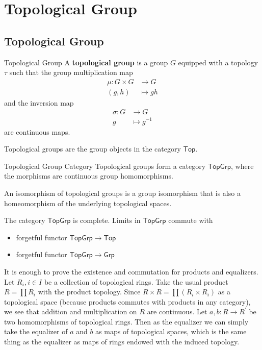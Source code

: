 
\chapter{Topological Group}
\section{Topological Group}
\begin{definition}{Topological Group}{}
    A \textbf{topological group} is a group $G$ equipped with a topology $\tau$ such that the group multiplication map
    \begin{align*}
        \mu:G\times G&\longrightarrow G\\
        (g,h)&\longmapsto gh
    \end{align*}
    and the inversion map
    \begin{align*}
        \sigma:G&\longrightarrow G\\
        g&\longmapsto g^{-1}
    \end{align*}
    are continuous maps.
\end{definition}

\noindent Topological groups are the group objects in the category $\mathsf{Top}$.
\begin{definition}{Topological Group Category}{}
    Topological groups form a category $\mathsf{TopGrp}$, where the morphisms are continuous group homomorphisms. 
\end{definition}

\noindent An isomorphism of topological groups is a group isomorphism that is also a homeomorphism of the underlying topological spaces.
\begin{proposition}{}{}
    The category $\mathsf{TopGrp}$ is complete. Limits in $\mathsf{TopGrp}$ commute with 
    \begin{itemize}
        \item forgetful functor $\mathsf{TopGrp}\to\mathsf{Top}$
        \item forgetful functor $\mathsf{TopGrp}\to\mathsf{Grp}$
    \end{itemize}
\end{proposition}

\begin{prf} 
    It is enough to prove the existence and commutation for products and equalizers. Let $R_i, i \in I$ be a collection of topological rings. Take the usual product $R=\prod R_i$ with the product topology. Since $R \times R=\prod\left(R_i \times R_i\right)$ as a topological space (because products commutes with products in any category), we see that addition and multiplication on $R$ are continuous. Let $a, b: R \rightarrow R^{\prime}$ be two homomorphisms of topological rings. Then as the equalizer we can simply take the equalizer of $a$ and $b$ as maps of topological spaces, which is the same thing as the equalizer as maps of rings endowed with the induced topology.
\end{prf}


